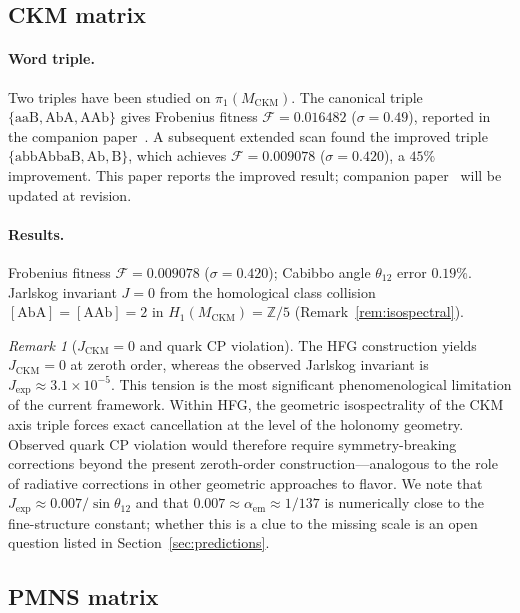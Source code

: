 \documentclass[11pt,a4paper]{article}
\theoremstyle{definition}
\theoremstyle{remark}
\newtheorem{remark}[theorem]{Remark}
\newcommand{\ZZ}{\mathbb{Z}}
\newcommand{\MCKM}{M_{\mathrm{CKM}}}
\begin{document}
\subsection{CKM matrix}

\paragraph{Word triple.}
Two triples have been studied on $\pi_1(\MCKM)$.
The canonical triple $\{\mathrm{aaB},\mathrm{AbA},\mathrm{AAb}\}$
gives Frobenius fitness $\mathcal{F}=0.016482$ ($\sigma=0.49$),
reported in the companion paper~\cite{Gentry:CKM}.
A subsequent extended scan found the improved triple
$\{\mathrm{abbAbbaB},\mathrm{Ab},\mathrm{B}\}$, which achieves
$\mathcal{F}=0.009078$ ($\sigma=0.420$), a $45\%$ improvement.
This paper reports the improved result; companion
paper~\cite{Gentry:CKM} will be updated at revision.

\paragraph{Results.}
Frobenius fitness $\mathcal{F}=0.009078$ ($\sigma=0.420$);
Cabibbo angle $\theta_{12}$ error $0.19\%$.
Jarlskog invariant $J=0$ from the homological class collision
$[\mathrm{AbA}]=[\mathrm{AAb}]=2$ in $H_1(\MCKM)=\ZZ/5$
(Remark~\ref{rem:isospectral}).

\begin{remark}[$J_\mathrm{CKM}=0$ and quark CP violation]
\label{rem:jckm}
The HFG construction yields $J_\mathrm{CKM}=0$ at zeroth order,
whereas the observed Jarlskog invariant is
$J_\mathrm{exp}\approx3.1\times10^{-5}$.
This tension is the most significant phenomenological limitation
of the current framework.
Within HFG, the geometric isospectrality of the CKM axis triple
forces exact cancellation at the level of the holonomy geometry.
Observed quark CP violation would therefore require
symmetry-breaking corrections beyond the present zeroth-order
construction---analogous to the role of radiative corrections
in other geometric approaches to flavor.
We note that $J_\mathrm{exp} \approx 0.007/\sin\theta_{12}$
and that $0.007 \approx \alpha_\mathrm{em} \approx 1/137$
is numerically close to the fine-structure constant;
whether this is a clue to the missing scale is an open question
listed in Section~\ref{sec:predictions}.
\end{remark}

\subsection{PMNS matrix}
\end{document}
